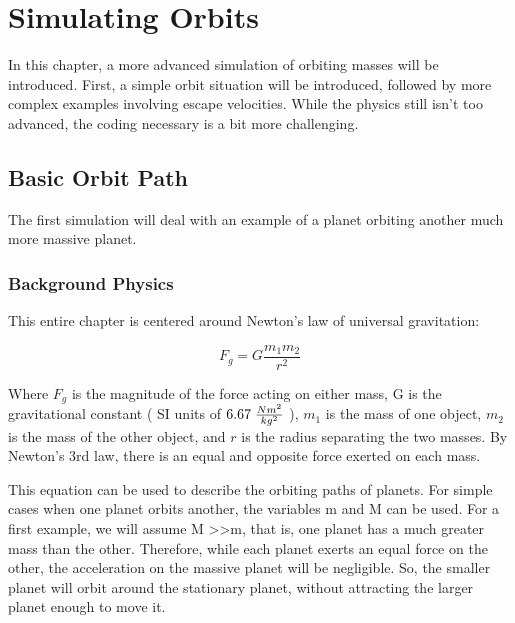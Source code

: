 
\chapter{Simulating Orbits} %

\label{Chapter2} %



In this chapter, a more advanced simulation of orbiting masses will be introduced.  First, a simple orbit situation will be introduced, followed by more complex examples involving escape velocities.  While the physics still isn't too advanced, the coding necessary is a bit more challenging.  



\section{Basic Orbit Path}

The first simulation will deal with an example of a planet orbiting another much more massive planet.  

\subsection{Background Physics}



This entire chapter is centered around Newton's law of universal gravitation:

\begin{equation}\label{universalgravity}
F_g = G \frac{m_1 m_2}{r^2} 
\end{equation}

Where $F_g$ is the magnitude of the force acting on either mass, G is the gravitational constant ( SI units of $6.67 \hspace{1mm} \frac{Nm^2}{kg^2}$ ), $m_1$ is the mass of one object, $m_2$ is the mass of the other object, and $r$ is the radius separating the two masses.  By Newton's 3rd law, there is an equal and opposite force exerted on each mass.  

This equation can be used to describe the orbiting paths of planets.  For simple cases when one planet orbits another, the variables m and M can be used.  For a first example, we will assume M \textgreater \textgreater  m, that is, one planet has a much greater mass than the other.  Therefore, while each planet exerts an equal force on the other, the acceleration on the massive planet will be negligible.  So, the smaller planet will orbit around the stationary planet, without attracting the larger planet enough to move it.  




